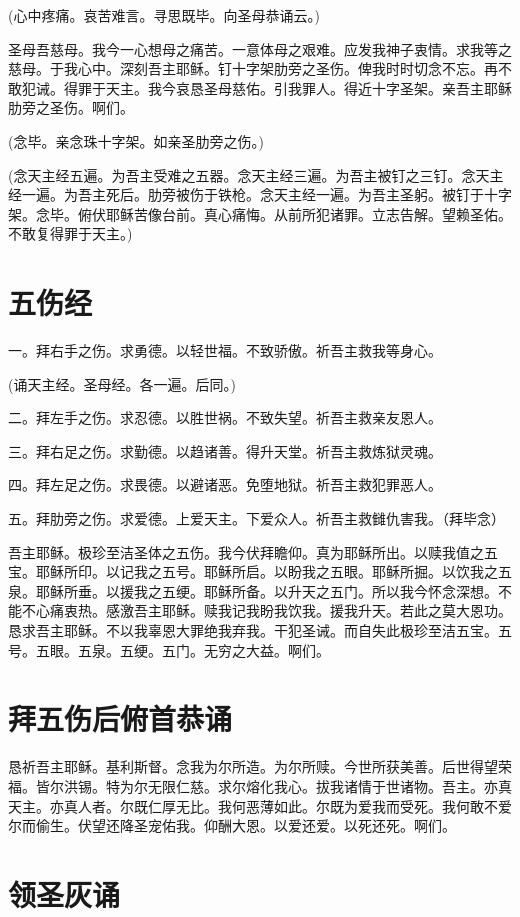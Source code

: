 \documentclass[UTF8,17pt]{ctexart}
\begin{document}
(⼼中疼痛。哀苦难⾔。寻思既毕。向圣母恭诵云。)

圣母吾慈母。我今⼀⼼想母之痛苦。⼀意体母之艰难。应发我神⼦衷情。求我等之慈母。于我⼼中。深刻吾主耶稣。钉⼗字架肋旁之圣伤。俾我时时切念不忘。再不敢犯诫。得罪于天主。我今哀恳圣母慈佑。引我罪⼈。得近⼗字圣架。亲吾主耶稣肋旁之圣伤。啊们。

(念毕。亲念珠⼗字架。如亲圣肋旁之伤。)

(念天主经五遍。为吾主受难之五器。念天主经三遍。为吾主被钉之三钉。念天主经⼀遍。为吾主死后。肋旁被伤于铁枪。念天主经⼀遍。为吾主圣躬。被钉于⼗字架。念毕。俯伏耶稣苦像台前。真⼼痛悔。从前所犯诸罪。⽴志告解。望赖圣佑。不敢复得罪于天主。)

\section{五伤经}

⼀。拜右⼿之伤。求勇德。以轻世福。不致骄傲。祈吾主救我等⾝⼼。

(诵天主经。圣母经。各⼀遍。后同。)

⼆。拜左⼿之伤。求忍德。以胜世祸。不致失望。祈吾主救亲友恩⼈。

三。拜右⾜之伤。求勤德。以趋诸善。得升天堂。祈吾主救炼狱灵魂。

四。拜左⾜之伤。求畏德。以避诸恶。免堕地狱。祈吾主救犯罪恶⼈。

五。拜肋旁之伤。求爱德。上爱天主。下爱众⼈。祈吾主救雠仇害我。（拜毕念）

吾主耶稣。极珍⾄洁圣体之五伤。我今伏拜瞻仰。真为耶稣所出。以赎我值之五宝。耶稣所印。以记我之五号。耶稣所启。以盼我之五眼。耶稣所掘。以饮我之五泉。耶稣所垂。以援我之五绠。耶稣所备。以升天之五门。所以我今怀念深想。不能不⼼痛衷热。感激吾主耶稣。赎我记我盼我饮我。援我升天。若此之莫⼤恩功。恳求吾主耶稣。不以我辜恩⼤罪绝我弃我。⼲犯圣诫。⽽⾃失此极珍⾄洁五宝。五号。五眼。五泉。五绠。五门。⽆穷之⼤益。啊们。

\section{拜五伤后俯⾸恭诵}

恳祈吾主耶稣。基利斯督。念我为尔所造。为尔所赎。今世所获美善。后世得望荣福。皆尔洪锡。特为尔⽆限仁慈。求尔熔化我⼼。拔我诸情于世诸物。吾主。亦真天主。亦真⼈者。尔既仁厚⽆⽐。我何恶薄如此。尔既为爱我⽽受死。我何敢不爱尔⽽偷⽣。伏望还降圣宠佑我。仰酬⼤恩。以爱还爱。以死还死。啊们。

\section{领圣灰诵}
\end{document}
